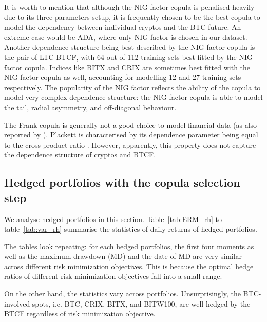 It is worth to mention that although the NIG factor copula is penalised heavily due to its three parameters setup,
it is frequently chosen to be the best copula to model the dependency
between individual cryptos and the BTC future. 
An extreme case would be ADA, where only NIG factor is chosen in our dataset.
Another dependence structure being best described by the NIG factor
copula is the pair of LTC-BTCF, with 
64 out of 112 training sets best fitted by the NIG factor copula.
Indices like BITX and CRIX are sometimes best fitted with the NIG
factor copula as well, accounting for modelling 12 and 27 training
sets respectively. 
The popularity of the NIG factor reflects the ability of the copula to
model very complex dependence structure: the 
NIG factor copula is able to model the tail, radial asymmetry, and
off-diagonal behaviour. 

The Frank copula is generally not a good choice to model financial
data (as also reported by \cite{barbi2014copula}).
Plackett is characterised by its dependence parameter being equal to
the cross-product ratio %
. 
However, apparently, this property does not capture the dependence
structure of cryptos and BTCF.


\begin{table}[t!]

%
    \label{tab:copulasection}
\end{table}

\subsection{Hedged portfolios with the copula selection step}\label{subsec:HP2}
We analyse hedged portfolios in this section.
Table~\ref{tab:ERM_rh} to table~\ref{tab:var_rh} summarise the statistics of daily returns of hedged portfolios. \medskip

The tables look repeating: for each hedged portfolios,
the first four moments as well as the maximum drawdown (MD) and the date of MD are very similar across different risk minimization objectives.
This is because the optimal hedge ratios of different risk minimization objectives fall into a small range. \medskip

On the other hand, the statistics vary across portfolios.
Unsurprisingly, the BTC-involved spots, i.e. BTC, CRIX, BITX, and BITW100, are well hedged by the BTCF regardless of risk minimization objective. \medskip

